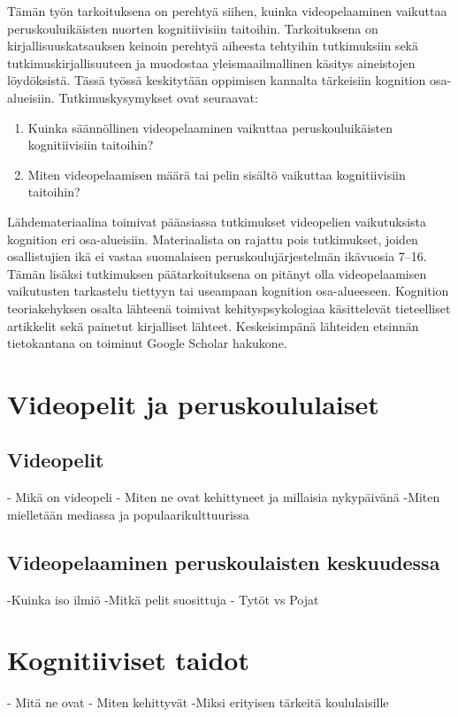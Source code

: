 \documentclass[utf8,bachelor]{gradu3}
\begin{document}
Tämän työn tarkoituksena on perehtyä siihen, kuinka videopelaaminen vaikuttaa peruskouluikäisten nuorten kognitiivisiin taitoihin. Tarkoituksena on kirjallisuuskatsauksen keinoin perehtyä aiheesta tehtyihin tutkimuksiin sekä tutkimuskirjallisuuteen ja muodostaa yleismaailmallinen käsitys aineistojen löydöksistä. Tässä työssä keskitytään oppimisen kannalta tärkeisiin kognition osa-alueisiin. Tutkimuskysymykset ovat seuraavat: 
\newpage
\begin{enumerate}
\item Kuinka säännöllinen videopelaaminen vaikuttaa peruskouluikäisten kognitiivisiin taitoihin? 
\item Miten videopelaamisen määrä tai pelin sisältö vaikuttaa kognitiivisiin taitoihin? 
\end{enumerate}

Lähdemateriaalina toimivat pääasiassa tutkimukset videopelien vaikutuksista kognition eri osa-alueisiin. Materiaalista on rajattu pois tutkimukset, joiden osallistujien ikä ei vastaa suomalaisen peruskoulujärjestelmän ikävuosia 7–16. Tämän lisäksi tutkimuksen päätarkoituksena on pitänyt olla videopelaamisen vaikutusten tarkastelu tiettyyn tai useampaan kognition osa-alueeseen. Kognition teoriakehyksen osalta lähteenä toimivat kehityspsykologiaa käsittelevät tieteelliset artikkelit sekä painetut kirjalliset lähteet.  Keskeisimpänä lähteiden etsinnän tietokantana on toiminut Google Scholar hakukone.  

\chapter{Videopelit ja peruskoululaiset}

\section{Videopelit}
- Mikä on videopeli
- Miten ne ovat kehittyneet ja millaisia nykypäivänä
-Miten mielletään mediassa ja populaarikulttuurissa

\section{Videopelaaminen peruskoulaisten keskuudessa}
-Kuinka iso ilmiö
-Mitkä pelit suosittuja
- Tytöt vs Pojat

\chapter{Kognitiiviset taidot}
- Mitä ne ovat
- Miten kehittyvät
-Miksi erityisen tärkeitä koululaisille
\end{document}
